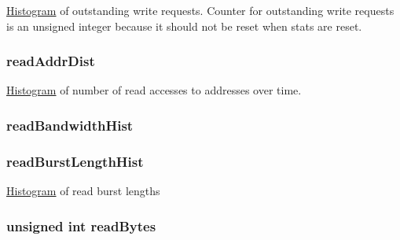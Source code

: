 \label{structCommMonitor_1_1MonitorStats_a4fef3195bdb93fcbb46f1bac89c3b2ef}
\hyperlink{classHistogram}{Histogram} of outstanding write requests. Counter for outstanding write requests is an unsigned integer because it should not be reset when stats are reset. \hypertarget{structCommMonitor_1_1MonitorStats_a4031ec599a20d5a1890ba1d37a565fbf}{
\subsubsection[{readAddrDist}]{ {\bf readAddrDist}}}
\label{structCommMonitor_1_1MonitorStats_a4031ec599a20d5a1890ba1d37a565fbf}
\hyperlink{classHistogram}{Histogram} of number of read accesses to addresses over time. \hypertarget{structCommMonitor_1_1MonitorStats_a4498b86fd1613e25f2d6d7b5d73b12fe}{
\subsubsection[{readBandwidthHist}]{ {\bf readBandwidthHist}}}
\label{structCommMonitor_1_1MonitorStats_a4498b86fd1613e25f2d6d7b5d73b12fe}
\hypertarget{structCommMonitor_1_1MonitorStats_a13870c09c7ac8408c22d8496f77deb21}{
\subsubsection[{readBurstLengthHist}]{ {\bf readBurstLengthHist}}}
\label{structCommMonitor_1_1MonitorStats_a13870c09c7ac8408c22d8496f77deb21}
\hyperlink{classHistogram}{Histogram} of read burst lengths \hypertarget{structCommMonitor_1_1MonitorStats_a7229cb3b887686f75714605936a6c0f0}{
\subsubsection[{readBytes}]{\setlength{\rightskip}{0pt plus 5cm}unsigned int {\bf readBytes}}}
